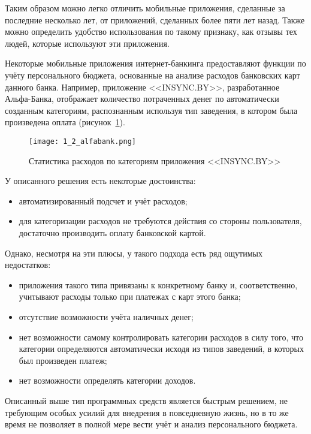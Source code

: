 Таким образом можно легко отличить мобильные приложения, сделанные за последние несколько лет, от приложений, сделанных более пяти лет назад.
Также можно определить удобство использования по такому признаку, как отзывы тех людей, которые используют эти приложения.

Некоторые мобильные приложения интернет-банкинга предоставляют функции по учёту персонального бюджета, основанные на анализе расходов банковских карт данного банка.
Например, приложение <<INSYNC.BY>>, разработанное Альфа-Банка, отображает количество потраченных денег по автоматически созданным категориям, распознанным используя тип заведения, в котором была произведена оплата (рисунок~\ref{fig:analysis:analogues:alfabank}).

\begin{figure}[H]
    \centering
    \texttt{[image: 1\_2\_alfabank.png]}
    \caption{Статистика расходов по категориям приложения <<INSYNC.BY>>}
    \label{fig:analysis:analogues:alfabank}
\end{figure}

У описанного решения есть некоторые достоинства:
\begin{itemize}
    \item автоматизированный подсчет и учёт расходов;
    \item для категоризации расходов не требуются действия со стороны пользователя, достаточно производить оплату банковской картой.
\end{itemize}

Однако, несмотря на эти плюсы, у такого подхода есть ряд ощутимых недостатков:
\begin{itemize}
    \item приложения такого типа привязаны к конкретному банку и, соответственно, учитывают расходы только при платежах с карт этого банка;
    \item отсутствие возможности учёта наличных денег;
    \item нет возможности самому контролировать категории расходов в силу того, что категории определяются автоматически исходя из типов заведений, в которых был произведен платеж;
    \item нет возможности определять категории доходов.
\end{itemize}

Описанный выше тип программных средств является быстрым решением, не требующим особых усилий для внедрения в повседневную жизнь, но в то же время не позволяет в полной мере вести учёт и анализ персонального бюджета.


